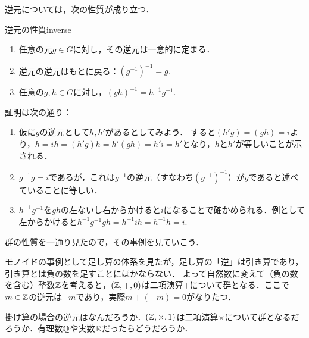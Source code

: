 \documentclass[11pt,a4paper]{jsarticle}
\begin{document}
逆元については，次の性質が成り立つ．
\begin{prop}{逆元の性質}{inverse}    
\begin{enumerate}
    \item 任意の元$g \in G$に対し，その逆元は一意的に定まる．
    \item 逆元の逆元はもとに戻る：$(g^{-1})^{-1}=g$.
    \item 任意の$g,h \in G$に対し，$(gh)^{-1}=h^{-1}g^{-1}$.
\end{enumerate}
\end{prop}
証明は次の通り：
\begin{enumerate}
    \item 仮に$g$の逆元として$h, h'$があるとしてみよう．
    すると$(h'g)=(gh)=i$より，$h = ih = (h'g)h = h'(gh) = h'i = h'$となり，$h$と$h'$が等しいことが示される．
    \item $g^{-1}g=i$であるが，これは$g^{-1}$の逆元（すなわち$(g^{-1})^{-1}$）が$g$であると述べていることに等しい．
    \item $h^{-1}g^{-1}$を$gh$の左ないし右からかけると$i$になることで確かめられる．例として左からかけると$h^{-1}g^{-1}gh = h^{-1} i h = h^{-1}h = i$.
\end{enumerate}

群の性質を一通り見たので，その事例を見ていこう．

\begin{rei}{}{}
    モノイドの事例として足し算の体系を見たが，足し算の「逆」は引き算であり，引き算とは負の数を足すことにほかならない．
    よって自然数に変えて（負の数を含む）整数$\mathbb{Z}$を考えると，$(\mathbb{Z}, +, 0)$は二項演算$+$について群となる．ここで$m \in \mathbb{Z}$の逆元は$-m$であり，実際$m + (-m) = 0$がなりたつ．
\end{rei}

\begin{renshu}{}{}
    掛け算の場合の逆元はなんだろうか．$(\mathbb{Z}, \times, 1)$は二項演算$\times$について群となるだろうか．有理数$\mathbb{Q}$や実数$\mathbb{R}$だったらどうだろうか．
\end{renshu}
\end{document}
